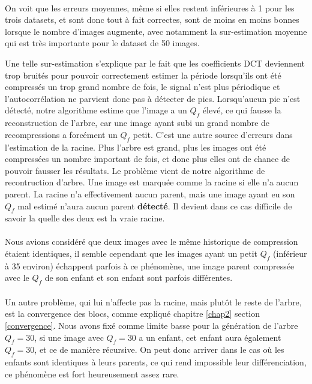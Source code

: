 \documentclass[utf8,final]{stageM2R} %
\begin{document}
\paragraph{}
On voit que les erreurs moyennes, même si elles restent inférieures à 1 pour les trois datasets, et sont donc tout à fait correctes, sont de moins en moins bonnes lorsque le nombre d'images augmente, avec notamment la sur-estimation moyenne qui est très importante pour le dataset de 50 images.

Une telle sur-estimation s'explique par le fait que les coefficients DCT deviennent trop bruités pour pouvoir correctement estimer la période lorsqu'ils ont été compressés un trop grand nombre de fois, le signal n'est plus périodique et l'autocorrélation ne parvient donc pas à détecter de pics. Lorsqu'aucun pic n'est détecté, notre algorithme estime que l'image a un $Q_f$ élevé, ce qui fausse la reconstruction de l'arbre, car une image ayant subi un grand nombre de recompressions a forcément un $Q_f$ petit. C'est une autre source d'erreurs dans l'estimation de la racine. Plus l'arbre est grand, plus les images ont été compressées un nombre important de fois, et donc plus elles ont de chance de pouvoir fausser les résultats. Le problème vient de notre algorithme de recontruction d'arbre. Une image est marquée comme la racine si elle n'a aucun parent. La racine n'a effectivement aucun parent, mais une image ayant eu son $Q_f$ mal estimé n'aura aucun parent \textbf{détecté}. Il devient dans ce cas difficile de savoir la quelle des deux est la vraie racine.
\paragraph{}

Nous avions considéré que deux images avec le même historique de compression étaient identiques, il semble cependant que les images ayant un petit $Q_f$ (inférieur à 35 environ) échappent parfois à ce phénomène, une image parent compressée avec le $Q_f$ de son enfant et son enfant sont parfois différentes.
\paragraph{}

Un autre problème, qui lui n'affecte pas la racine, mais plutôt le reste de l'arbre, est la convergence des blocs, comme expliqué chapitre \ref{chap2} section \ref{convergence}. Nous avons fixé comme limite basse pour la génération de l'arbre $Q_f = 30$, si une image avec $Q_f = 30$ a un enfant, cet enfant aura également $Q_f = 30$, et ce de manière récursive. On peut donc arriver dans le cas où les enfants sont identiques à leurs parents, ce qui rend impossible leur différenciation, ce phénomène est fort heureusement assez rare.
\end{document}
